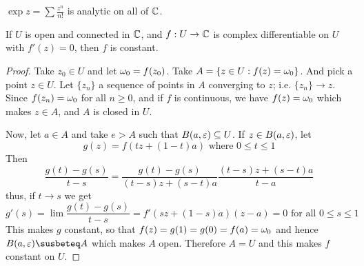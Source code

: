 \begin{example}\label{example_3.3}
    $\exp{z}=\sum{\frac{z^n}{n!}}$ is analytic on all of $\mathbb{C}$.
\end{example}

\begin{lemma}\label{3.2.5}
    If $U$ is open and connected in $\mathbb{C}$, and $f:U \xrightarrow{} \mathbb{C}$ is complex
    differentiable on $U$ with  $f'(z)=0$, then $f$ is constant.
\end{lemma}
\begin{proof}
    Take $z_0 \in U$ and let $\omega_0=f(z_0)$. Take $A=\{z \in U : f(z)=\omega_0\}$.
    And pick a point $z \in U$. Let  $\{z_n\}$ a sequence of points in $A$
    converging to $z$; i.e. $\{z_n\} \xrightarrow{} z$. Since $f(z_n)=\omega_0$ for
    all $n \geq 0$, and if  $f$ is continuous, we have  $f(z)=\omega_0$ which makes
    $z \in A$, and  $A$ is closed in $U$.

    Now, let $a \in A$ and take $e>A$ such that $B(a,\varepsilon) \subseteq U$. If $z \in
    B(a,\varepsilon)$, let
    \begin{equation*}
        g(z)=f(tz+(1-t)a) \text{ where } 0 \leq t \leq 1
    \end{equation*}
    Then
    \begin{equation*}
        \frac{g(t)-g(s)}{t-s}=\frac{g(t)-g(s)}{(t-s)z+(s-t)a}\frac{(t-s)z+(s-t)a}{t-a}
    \end{equation*}
    thus, if $t \xrightarrow{} s$ we get
    \begin{equation*}
         g'(s)=\lim{\frac{g(t)-g(s)}{t-s}}=f'(sz+(1-s)a)(z-a)=0 \text{ for all }
         0 \leq s \leq 1
    \end{equation*}
    This makes $g$ constant, so that $f(z)=g(1)=g(0)=f(a)=\omega_0$ and hence
    $B(a,\e) \susbeteq A$ which makes $A$ open. Therefore  $A=U$ and this makes
     $f$ constant on  $U$.
\end{proof}


